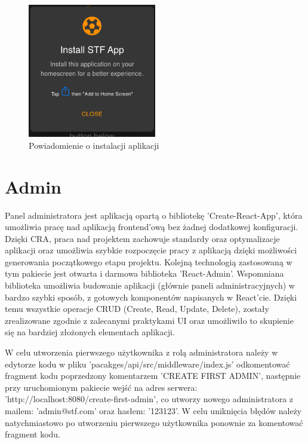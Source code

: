 \begin{figure}[h!]
  \centering
    \includegraphics[width=0.5\textwidth]{images/player/PWA_promt.png}
  \caption{Powiadomienie o instalacji aplikacji}
  \label{fig:mobile}
\end{figure}


\section{Admin}

Panel administratora jest aplikacją opartą o bibliotekę 'Create-React-App', która umożliwia pracę nad aplikacją frontend'ową bez żadnej dodatkowej konfiguracji. Dzięki CRA, praca nad projektem zachowuje standardy oraz optymalizacje aplikacji oraz umożliwia szybkie rozpoczęcie pracy z aplikacją dzięki możliwości generowania początkowego etapu projektu. Kolejną technologią zastosowaną w tym pakiecie jest otwarta i darmowa biblioteka 'React-Admin'. Wspomniana biblioteka umożliwia budowanie aplikacji (głównie paneli administracyjnych) w bardzo szybki sposób, z gotowych komponentów napisanych w React'cie. Dzięki temu wszystkie operacje CRUD (Create, Read, Update, Delete), zostały zrealizowane zgodnie z zalecanymi praktykami UI oraz umożliwiło to skupienie się na bardziej złożonych elementach aplikacji.

W celu utworzenia pierwszego użytkownika z rolą administratora należy w edytorze kodu w pliku 'pacakges/api/src/middleware/index.js' odkomentować fragment kodu poprzedzony komentarzem 'CREATE FIRST ADMIN', następnie przy uruchomionym pakiecie wejść na adres serwera: 'http://localhost:8080/create-first-admin', co utworzy nowego administratora z mailem: 'admin@stf.com' oraz hasłem: '123123'. W celu uniknięcia błędów należy natychmiastowo po utworzeniu pierwszego użytkownika ponownie za komentować fragment kodu.

